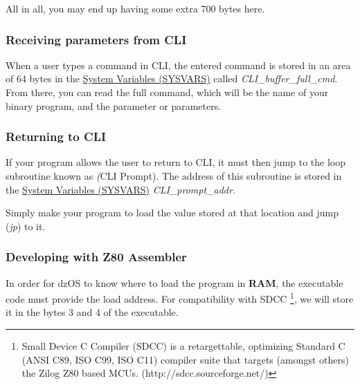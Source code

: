         All in all, you may end up having some extra 700 bytes here.

        \subsubsection{Receiving parameters from CLI}
        When a user types a command in CLI, the entered command is stored in an area
        of 64 bytes in the \hyperref[sec:ram_memmap]{System Variables (SYSVARS)} 
        called \textit{CLI\_buffer\_full\_cmd}. From there, you can read the full
        command, which will be the name of your binary program, and the parameter or
        parameters.

        \subsubsection{Returning to CLI}

        If your program allows the user to return to CLI, it must then jump to the
        loop subroutine known as \textit(CLI Prompt). The address of this subroutine
        is stored in the \hyperref[sec:ram_memmap]{System Variables (SYSVARS)}
        \textit{CLI\_prompt\_addr}.

        Simply make your program to load the value stored at that location and jump
        (\textit{jp}) to it.

        \subsubsection{Developing with Z80 Assembler}
        In order for dzOS to know where to load the program in \textbf{RAM}, the
        executable code must provide the load address. For compatibility with SDCC
        \footnote{Small Device C Compiler (SDCC) is a retargettable, optimizing
        Standard C (ANSI C89, ISO C99, ISO C11) compiler suite that targets (amongst
        others) the Zilog Z80 based MCUs. (http://sdcc.sourceforge.net/)}, we will
        store it in the bytes 3 and 4 of the executable.

